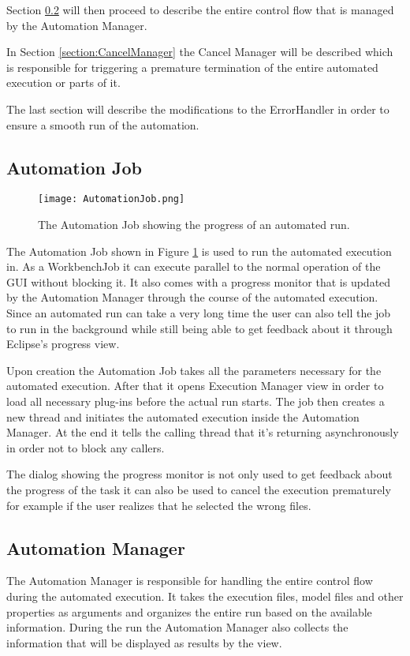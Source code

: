 Section \ref{section:AutomationManager} will then proceed to describe the entire control flow that is managed by the Automation Manager.

In Section \ref{section:CancelManager} the Cancel Manager will be described which is
responsible for triggering a premature termination of the entire automated execution or parts
of it.

The last section will describe the modifications to the ErrorHandler in order to ensure a smooth
run of the automation.

\subsection{Automation Job}
\label{section:AutomationJob}
\begin{figure}
  \centering
  \texttt{[image: AutomationJob.png]}
  \caption[The Automation Job showing the progress of an automated run.]%
  {The Automation Job showing the progress of an automated run.\protect}
  \label{fig:AutomationJob}
\end{figure}
The Automation Job shown in Figure \ref{fig:AutomationJob} is used to run the automated execution in. 
As a WorkbenchJob it can execute parallel
to the normal operation of the \ac{GUI} without blocking it. It also comes with a progress monitor that
is updated by the Automation Manager through the course of the automated execution. Since an automated run
can take a very long time the user can also tell the job to run in the background while still being able
to get feedback about it through Eclipse's progress view.

Upon creation the Automation Job takes all the parameters necessary for the automated execution. After that
it opens Execution Manager view in order to load all necessary plug-ins before the actual run starts. 
The job then creates a new thread and initiates the automated execution inside the Automation Manager.
At the end it tells the calling thread that it's returning asynchronously in order not to block any callers.

The dialog showing the progress monitor is not only used to get feedback about the progress of the task
it can also be used to cancel the execution prematurely for example if the user realizes that he selected
the wrong files.

\subsection{Automation Manager}
\label{section:AutomationManager}
The Automation Manager is responsible for handling the entire control flow during the automated execution.
It takes the execution files, model files and other properties as arguments and organizes the entire
run based on the available information. During the run the Automation Manager also collects the information
that will be displayed as results by the view.

